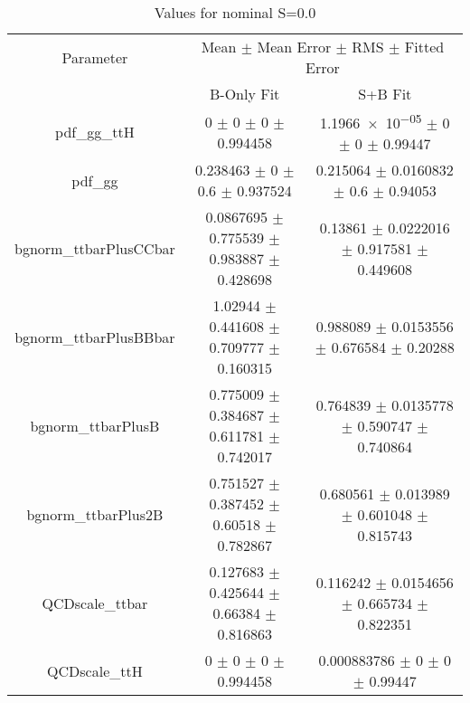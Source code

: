 \begin{table}
\centering
\caption{Values for nominal S=0.0}
\begin{tabular}{ccc}
\toprule
Parameter & \multicolumn{2}{c}{Mean $\pm$ Mean Error $\pm$ RMS $\pm$ Fitted Error}\\
 & B-Only Fit & S+B Fit\\
\midrule
pdf\_gg\_ttH & \num{0} $\pm$ \num{0} $\pm$ \num{0} $\pm$ \num{0.994458} & \num{1.1966e-05} $\pm$ \num{0} $\pm$ \num{0} $\pm$ \num{0.99447}\\
pdf\_gg & \num{0.238463} $\pm$ \num{0} $\pm$ \num{0.6} $\pm$ \num{0.937524} & \num{0.215064} $\pm$ \num{0.0160832} $\pm$ \num{0.6} $\pm$ \num{0.94053}\\
bgnorm\_ttbarPlusCCbar & \num{0.0867695} $\pm$ \num{0.775539} $\pm$ \num{0.983887} $\pm$ \num{0.428698} & \num{0.13861} $\pm$ \num{0.0222016} $\pm$ \num{0.917581} $\pm$ \num{0.449608}\\
bgnorm\_ttbarPlusBBbar & \num{1.02944} $\pm$ \num{0.441608} $\pm$ \num{0.709777} $\pm$ \num{0.160315} & \num{0.988089} $\pm$ \num{0.0153556} $\pm$ \num{0.676584} $\pm$ \num{0.20288}\\
bgnorm\_ttbarPlusB & \num{0.775009} $\pm$ \num{0.384687} $\pm$ \num{0.611781} $\pm$ \num{0.742017} & \num{0.764839} $\pm$ \num{0.0135778} $\pm$ \num{0.590747} $\pm$ \num{0.740864}\\
bgnorm\_ttbarPlus2B & \num{0.751527} $\pm$ \num{0.387452} $\pm$ \num{0.60518} $\pm$ \num{0.782867} & \num{0.680561} $\pm$ \num{0.013989} $\pm$ \num{0.601048} $\pm$ \num{0.815743}\\
QCDscale\_ttbar & \num{0.127683} $\pm$ \num{0.425644} $\pm$ \num{0.66384} $\pm$ \num{0.816863} & \num{0.116242} $\pm$ \num{0.0154656} $\pm$ \num{0.665734} $\pm$ \num{0.822351}\\
QCDscale\_ttH & \num{0} $\pm$ \num{0} $\pm$ \num{0} $\pm$ \num{0.994458} & \num{0.000883786} $\pm$ \num{0} $\pm$ \num{0} $\pm$ \num{0.99447}\\
\bottomrule
\end{tabular}
\end{table}